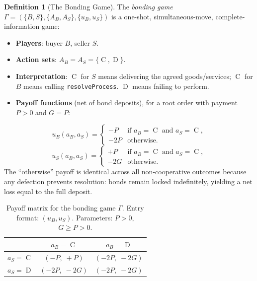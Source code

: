 \documentclass[11pt,a4paper]{article}
\theoremstyle{definition}
\newtheorem{definition}[theorem]{Definition}
\theoremstyle{remark}
\newcommand{\pay}{P}           %
\newcommand{\cumval}{G}        %
\newcommand{\ub}{u_B}          %
\newcommand{\us}{u_S}          %
\DeclareMathOperator{\Coop}{C}
\DeclareMathOperator{\Def}{D}
\begin{document}
\begin{definition}[The Bonding Game]
\label{def:bonding-game}
The \emph{bonding game} $\Gamma = (\{B, S\}, \{A_B, A_S\}, \{\ub, \us\})$
is a one-shot, simultaneous-move, complete-information game:
\begin{itemize}
  \item \textbf{Players}: buyer $B$, seller $S$.
  \item \textbf{Action sets}: $A_B = A_S = \{\Coop, \Def\}$.
  \item \textbf{Interpretation}: $\Coop$ for $S$ means delivering the
    agreed goods/services; $\Coop$ for $B$ means calling
    \texttt{resolveProcess}. $\Def$ means failing to perform.
  \item \textbf{Payoff functions} (net of bond deposits), for a root
    order with payment $\pay > 0$ and $\cumval = \pay$:
\end{itemize}
\begin{equation}\label{eq:utility-buyer}
  \ub(a_B, a_S) =
  \begin{cases}
    -\pay & \text{if } a_B = \Coop \text{ and } a_S = \Coop, \\
    -2\pay & \text{otherwise}.
  \end{cases}
\end{equation}
\begin{equation}\label{eq:utility-seller}
  \us(a_B, a_S) =
  \begin{cases}
    +\pay & \text{if } a_B = \Coop \text{ and } a_S = \Coop, \\
    -2\cumval & \text{otherwise}.
  \end{cases}
\end{equation}
The ``otherwise'' payoff is identical across all non-cooperative
outcomes because any defection prevents resolution: bonds remain
locked indefinitely, yielding a net loss equal to the full deposit.
\end{definition}

\begin{table}[ht]
\centering
\caption{Payoff matrix for the bonding game $\Gamma$.
Entry format: $(\ub, \us)$. Parameters: $\pay > 0$,
$\cumval \geq \pay > 0$.}
\label{tab:payoff-matrix}
\begin{tabular}{lcc}
\toprule
 & $a_B = \Coop$ & $a_B = \Def$ \\
\midrule
$a_S = \Coop$ & $(-\pay,\; +\pay)$ & $(-2\pay,\; -2\cumval)$ \\
$a_S = \Def$  & $(-2\pay,\; -2\cumval)$ & $(-2\pay,\; -2\cumval)$ \\
\bottomrule
\end{tabular}
\end{table}
\end{document}
